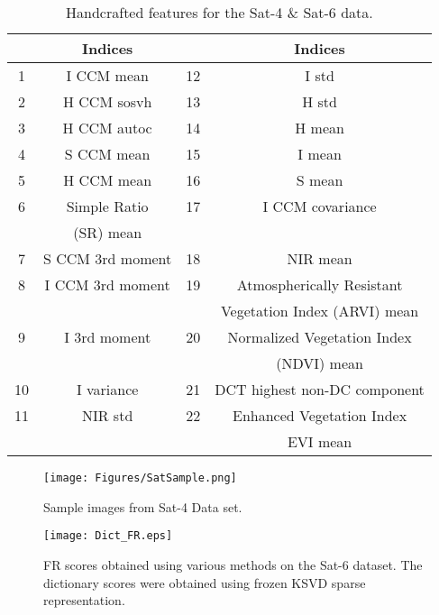 \documentclass[11pt]{article}
\begin{document}

\begin{table}[tbp]
    \caption{Handcrafted features for the Sat-4 \& Sat-6 data.}
    \label{table: Features}
    \centering
    \begin{tabular}{|c|c|c|c|}
        \hline
        \textbf{} & \textbf{Indices} & \textbf{} & \textbf{Indices}\\
        \hline
        1 & I CCM mean & 12 & I std \\
        \hline
        2 & H CCM sosvh & 13 & H std \\
        \hline
        3 & H CCM autoc & 14 & H mean \\
        \hline
        4 & S CCM mean & 15 & I mean \\
        \hline
        5 & H CCM mean & 16 & S mean \\
        \hline
        6 & Simple Ratio & 17 & I CCM covariance \\
        & (SR) mean & & \\
        \hline
        7 & S CCM 3rd moment & 18 & NIR mean \\
        \hline
        8 & I CCM 3rd moment & 19 & Atmospherically Resistant  \\
        & & & Vegetation Index (ARVI) mean\\
        \hline
        9 & I 3rd moment & 20 & Normalized Vegetation Index \\
        & & & (NDVI) mean\\
        \hline
        10 & I variance & 21 & DCT highest non-DC component\\
        \hline
        11 & NIR std & 22 & Enhanced Vegetation Index \\
        & & &EVI mean\\
        \hline
    \end{tabular}
\end{table}

\begin{figure}[H]
\centerline{\texttt{[image: Figures/SatSample.png]}}
\caption{Sample images from Sat-4 Data set.}
\label{fig: SatSample}
\end{figure}

\begin{figure*}[!t]%
\centering
\texttt{[image: Dict\_FR.eps]}
\caption{FR scores obtained using various methods on the Sat-6 dataset. The dictionary scores were obtained using frozen KSVD sparse representation.}%
\label{fig:FR}%
\end{figure*}
\end{document}
